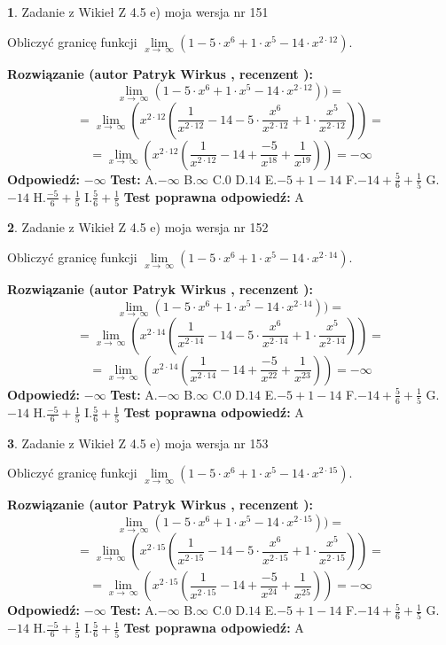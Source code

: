 \documentclass[12pt, a4paper]{article}
\theoremstyle{definition} %
\newtheorem{zad}{}
\newcommand{\zadStart}[1]{\begin{zad}#1\newline}
\newcommand{\zadStop}{\end{zad}}
\newcommand{\rozwStart}[2]{\noindent \textbf{Rozwiązanie (autor #1 , recenzent #2): }\newline}
\newcommand{\rozwStop}{\newline}
\newcommand{\odpStart}{\noindent \textbf{Odpowiedź:}\newline}
\newcommand{\odpStop}{\newline}
\newcommand{\testStart}{\noindent \textbf{Test:}\newline}
\newcommand{\testStop}{\newline}
\newcommand{\kluczStart}{\noindent \textbf{Test poprawna odpowiedź:}\newline}
\newcommand{\kluczStop}{\newline}
\begin{document}
\zadStart{Zadanie z Wikieł Z 4.5 e) moja wersja nr 151}



Obliczyć granicę funkcji  $\lim\limits_{x\to\ \infty}(1 - 5 \cdot x^{6}+1 \cdot x^{5}- 14 \cdot x^{2\cdot12})$.
\zadStop
\rozwStart{Patryk Wirkus}{}
$$\lim\limits_{x\to\ \infty}(1 - 5 \cdot x^{6}+1 \cdot x^{5}- 14 \cdot x^{2\cdot12}))=$$
$$=\lim\limits_{x\to\ \infty}(x^{2\cdot12}(\frac{1}{x^{2\cdot12}}-14 -5 \cdot \frac{x^{6}}{x^{2\cdot12}}+1 \cdot \frac{x^{5}}{x^{2\cdot12}}))=$$
$$=\lim\limits_{x\to\ \infty}(x^{2\cdot12}(\frac{1}{x^{2\cdot12}}-14 + \frac{-5}{x^{18}}+ \frac{1}{x^{19}}))=-\infty$$
\rozwStop
\odpStart
$-\infty$
\odpStop
\testStart
A.$-\infty$ B.$\infty$ C.$0$ D.$14$ E.$-5 + 1 - 14$
F.$-14+\frac{5}{6}+\frac{1}{5}$ G.$-14$
H.$\frac{-5}{6}+\frac{1}{5}$
I.$\frac{5}{6}+\frac{1}{5}$
\testStop
\kluczStart
A
\kluczStop



\zadStart{Zadanie z Wikieł Z 4.5 e) moja wersja nr 152}



Obliczyć granicę funkcji  $\lim\limits_{x\to\ \infty}(1 - 5 \cdot x^{6}+1 \cdot x^{5}- 14 \cdot x^{2\cdot14})$.
\zadStop
\rozwStart{Patryk Wirkus}{}
$$\lim\limits_{x\to\ \infty}(1 - 5 \cdot x^{6}+1 \cdot x^{5}- 14 \cdot x^{2\cdot14}))=$$
$$=\lim\limits_{x\to\ \infty}(x^{2\cdot14}(\frac{1}{x^{2\cdot14}}-14 -5 \cdot \frac{x^{6}}{x^{2\cdot14}}+1 \cdot \frac{x^{5}}{x^{2\cdot14}}))=$$
$$=\lim\limits_{x\to\ \infty}(x^{2\cdot14}(\frac{1}{x^{2\cdot14}}-14 + \frac{-5}{x^{22}}+ \frac{1}{x^{23}}))=-\infty$$
\rozwStop
\odpStart
$-\infty$
\odpStop
\testStart
A.$-\infty$ B.$\infty$ C.$0$ D.$14$ E.$-5 + 1 - 14$
F.$-14+\frac{5}{6}+\frac{1}{5}$ G.$-14$
H.$\frac{-5}{6}+\frac{1}{5}$
I.$\frac{5}{6}+\frac{1}{5}$
\testStop
\kluczStart
A
\kluczStop



\zadStart{Zadanie z Wikieł Z 4.5 e) moja wersja nr 153}



Obliczyć granicę funkcji  $\lim\limits_{x\to\ \infty}(1 - 5 \cdot x^{6}+1 \cdot x^{5}- 14 \cdot x^{2\cdot15})$.
\zadStop
\rozwStart{Patryk Wirkus}{}
$$\lim\limits_{x\to\ \infty}(1 - 5 \cdot x^{6}+1 \cdot x^{5}- 14 \cdot x^{2\cdot15}))=$$
$$=\lim\limits_{x\to\ \infty}(x^{2\cdot15}(\frac{1}{x^{2\cdot15}}-14 -5 \cdot \frac{x^{6}}{x^{2\cdot15}}+1 \cdot \frac{x^{5}}{x^{2\cdot15}}))=$$
$$=\lim\limits_{x\to\ \infty}(x^{2\cdot15}(\frac{1}{x^{2\cdot15}}-14 + \frac{-5}{x^{24}}+ \frac{1}{x^{25}}))=-\infty$$
\rozwStop
\odpStart
$-\infty$
\odpStop
\testStart
A.$-\infty$ B.$\infty$ C.$0$ D.$14$ E.$-5 + 1 - 14$
F.$-14+\frac{5}{6}+\frac{1}{5}$ G.$-14$
H.$\frac{-5}{6}+\frac{1}{5}$
I.$\frac{5}{6}+\frac{1}{5}$
\testStop
\kluczStart
A
\kluczStop
\end{document}
